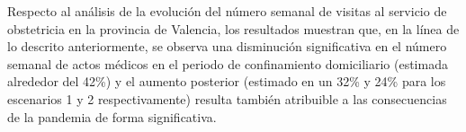 \documentclass[12pt,twoside]{article} %
\begin{document}
Respecto al análisis de la evolución del número semanal de visitas al servicio de obstetricia en la provincia de Valencia, los resultados muestran que, en la línea de lo descrito anteriormente, se observa una disminución significativa en el número semanal de actos médicos en el periodo de confinamiento domiciliario (estimada alrededor del 42\%) y el aumento posterior (estimado en un 32\% y 24\% para los escenarios 1 y 2 respectivamente) resulta también atribuible a las consecuencias de la pandemia de forma significativa.

\parskip=0pt
\parsep=0pt



\end{document}
